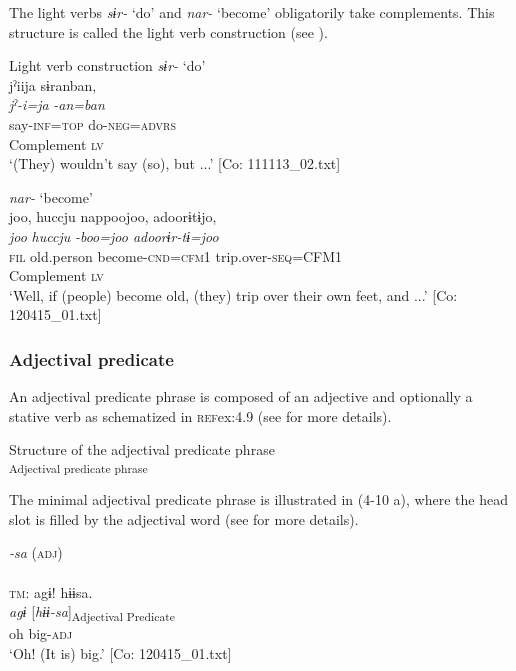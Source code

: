 The light verbs \textit{sɨr-} ‘do’ and \textit{nar-} ‘become’ obligatorily take complements. This structure is called the light verb construction (see ).

\ea  Light verb construction \label{ex:4.8}
 \ea  \textit{sɨr-} ‘do’\\
    \glll jˀiija  sɨranban,\\
    \textit{jˀ-i=ja}  \textit{-an=ban}\\
    say-\textsc{inf}=\textsc{top}  do-\textsc{neg}=\textsc{advrs}\\
    Complement  \textsc{lv}\\
    \glt ‘(They) wouldn’t say (so), but ...’    [Co: 111113\_02.txt]

\ex\textit{nar-} ‘become’\\
\glll joo,  huccju  nappoojoo,  adoorɨtɨjo,\\
    \textit{joo}  \textit{huccju}  \textit{-boo=joo  adoorɨr-tɨ=joo}\\
    \textsc{fil}  old.person  become-\textsc{cnd}=\textsc{cfm}1  trip.over-\textsc{seq}=CFM1\\
      Complement  \textsc{lv}  \\
    \glt ‘Well, if (people) become old, (they) trip over their own feet, and ...’     [Co: 120415\_01.txt]
    \z
\z

\subsubsection{Adjectival predicate}\label{sec:4.1.3.2}

An adjectival predicate phrase is composed of an adjective and optionally a stative verb as schematized in \textsc{ref}{ex:4.9} (see  for more details).

\ea  Structure of the adjectival predicate phrase \label{ex:4.9}\\\textsubscript{Adjectival predicate phrase}
\z

The minimal adjectival predicate phrase is illustrated in (4-10 a), where the head slot is filled by the adjectival word (see  for more details).

\ea   \label{ex:4.10}
\ea \textit{{}-sa} (\textsc{adj}) \label{ex:4.10a}\\\\
\glll  \textsc{tm}:  agɨ!  hɨɨsa.\\
    \textit{agɨ}  [\textit{hɨɨ-sa}]\textsubscript{Adjectival Predicate}\\
    oh  big-\textsc{adj}\\
    \glt     ‘Oh! (It is) big.’ [Co: 120415\_01.txt]

